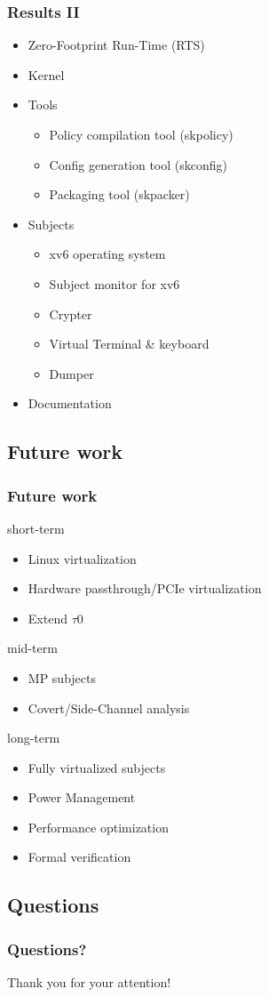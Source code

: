 \documentclass[xcolor={dvipsnames}]{beamer}
\begin{document}
\begin{frame}\frametitle{Results II}
\begin{itemize}
	\item Zero-Footprint Run-Time (RTS)
	\item Kernel
	\item Tools
	\begin{itemize}
		\item Policy compilation tool (skpolicy)
		\item Config generation tool (skconfig)
		\item Packaging tool (skpacker)
	\end{itemize}
	\item Subjects
	\begin{itemize}
		\item xv6 operating system
		\item Subject monitor for xv6
		\item Crypter
		\item Virtual Terminal \& keyboard
		\item Dumper
	\end{itemize}
	\item Documentation
\end{itemize}
\end{frame}

\subsection{Future work}
\begin{frame}\frametitle{Future work}
\begin{block}{short-term}
	\begin{itemize}
		\item Linux virtualization
		\item Hardware passthrough/PCIe virtualization
		\item Extend $\tau$0
	\end{itemize}
\end{block}
\begin{block}{mid-term}
	\begin{itemize}
		\item MP subjects
		\item Covert/Side-Channel analysis
	\end{itemize}
\end{block}
\begin{block}{long-term}
	\begin{itemize}
		\item Fully virtualized subjects
		\item Power Management
		\item Performance optimization
		\item Formal verification
	\end{itemize}
\end{block}
\end{frame}

\subsection{Questions}
\begin{frame}\frametitle{Questions?}
\begin{center}
	Thank you for your attention!
\end{center}
\end{frame}
\end{document}
